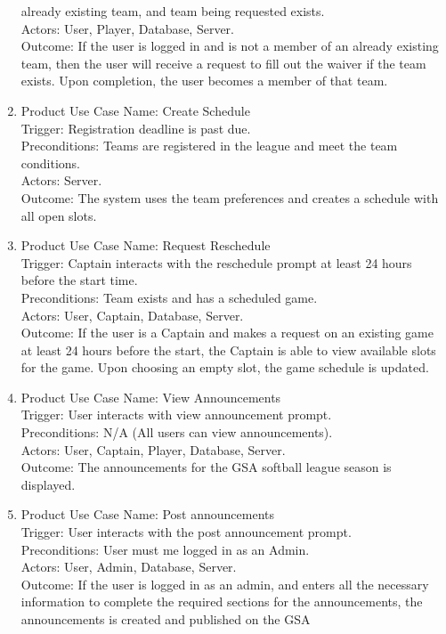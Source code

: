 \documentclass[12pt]{article}
\begin{document}
\begin{enumerate}
	already existing team, and team being requested exists.\\
	Actors: User, Player, Database, Server.\\
	Outcome: If the user is logged in and is not a member of an already existing team, then
	the user will receive a request to fill out the waiver if the team exists. Upon completion,
	the user becomes a member of that team.
	\item Product Use Case Name: Create Schedule \\
	Trigger: Registration deadline is past due.\\
	Preconditions: Teams are registered in the league and meet the team conditions.\\
	Actors: Server.\\
	Outcome: The system uses the team preferences and creates a schedule with all open slots.
	\item Product Use Case Name: Request Reschedule \\
	Trigger: Captain interacts with the reschedule prompt at least 24 hours before the start time.\\
	Preconditions: Team exists and has a scheduled game.\\
	Actors: User, Captain, Database, Server.\\
	Outcome: If the user is a Captain and makes a request on an existing game at least 24 hours before
	the start, the Captain is able to view available slots for the game. Upon choosing an empty slot, the
	game schedule is updated.
	\item Product Use Case Name: View Announcements \\
	Trigger: User interacts with view announcement prompt.\\
	Preconditions: N/A (All users can view announcements).\\
	Actors: User, Captain, Player, Database, Server.\\
	Outcome: The announcements for the GSA softball league season is displayed.
	\item Product Use Case Name: Post announcements \\
	Trigger: User interacts with the post announcement prompt.\\
	Preconditions: User must me logged in as an Admin.\\
	Actors: User, Admin, Database, Server.\\
	Outcome: If the user is logged in as an admin, and enters all the necessary information to complete
	the required sections for the announcements, the announcements is created and published on the GSA

\end{enumerate}
\end{document}

